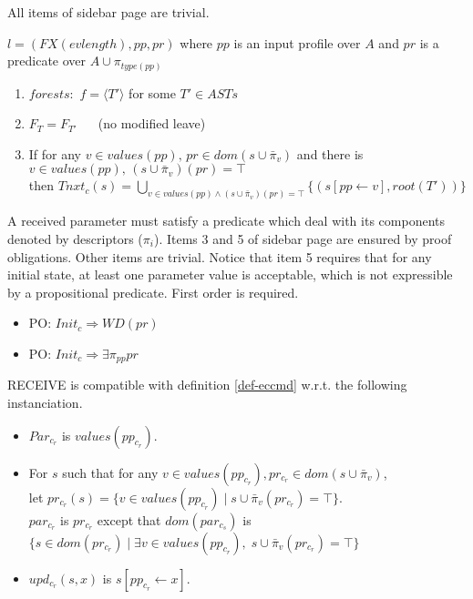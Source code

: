 \documentclass{article}
\begin{document}
All items of sidebar page \pageref{safestates} are trivial.
\begin{definition}[RECEIVE] $l=(FX(evlength),pp,pr)$ where $pp$ is an input profile over $A$ and $pr$ is a predicate over $A\cup\pi_{type(pp)}$
\begin{enumerate} 
\item $forests:$  $f=\langle T'\rangle$ for some $T'\in ASTs$
\item $F_T=F_{T'}~~~~~~$ {\small (no modified leave)}\setcounter{enumi}{3} 
\item If for any $v\in values(pp),\,pr\in dom(s\cup \bar\pi_v)$ and there is $v\in values(pp),\,(s\cup \bar\pi_v)(pr)=\top$\\
      then $T\!nxt_c(s)=\bigcup_{v\in values(pp) \wedge (s\cup \bar\pi_v)(pr)=\top}\{(s[pp\leftarrow v],root(T'))\}$
\end{enumerate}
\end{definition}
A received parameter must satisfy a predicate which deal with its components denoted by descriptors ($\pi_i$). Items 3 and 5 of sidebar page \pageref{safestates} are ensured by proof obligations. Other items are trivial. Notice that item 5 requires that for any initial state, at least one parameter value is acceptable, which is not expressible by a propositional predicate. First order is required.
\begin{itemize}
\item PO: $Init_c\Rightarrow W\!D(pr)$
\item PO: $Init_c\Rightarrow \exists \pi_{pp} pr$
\end{itemize}
RECEIVE is compatible with definition \ref{def-eccmd} w.r.t. the following instanciation. 
\begin{itemize}
\item $Par_{c_r}$ is $values(pp_{c_r})$. 
\item For $s$ such that for any $v\in values(pp_{c_r}), pr_{c_r}\in dom(s\cup \bar\pi_v)$,\\ let $pr_{c_r}(s)=\{v\in values(pp_{c_r})\mid s\cup \bar\pi_v(pr_{c_r})=\top\}$.\\
$par_{c_r}$ is $pr_{c_r}$ except that $dom(par_{c_s})$ is $\{s\in dom(pr_{c_r})\mid\exists v\in values(pp_{c_r}),\;s\cup \bar\pi_v(pr_{c_r})=\top\}$
\item $upd_{c_r}(s,x)$ is $s[pp_{c_r}\leftarrow x]$.
\end{itemize}
\end{document}
